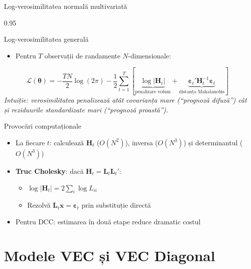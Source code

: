 \documentclass[9pt, aspectratio=169, t]{beamer}
\begin{document}
\begin{frame}{Log-verosimilitatea normală multivariată}
    \begin{cminipage}{0.95\textwidth}
    {\footnotesize
    \begin{block}{Log-verosimilitatea generală}
        \begin{itemize}\setlength{\itemsep}{0pt}
            \item Pentru $T$ observații de randamente $N$-dimensionale:
        \end{itemize}
        \[
            \mathcal{L}(\boldsymbol{\theta}) = -\frac{TN}{2}\log(2\pi) - \frac{1}{2}\sum_{t=1}^T \left[ \underbrace{\log|\mathbf{H}_t|}_{\text{penalizare volum}} + \underbrace{\boldsymbol{\varepsilon}_t'\mathbf{H}_t^{-1}\boldsymbol{\varepsilon}_t}_{\text{distanța Mahalanobis}} \right]
        \]
        \textit{Intuiție: verosimilitatea penalizează atât covarianța mare (``prognoză difuză'') cât și reziduurile standardizate mari (``prognoză proastă'').}
    \end{block}
    \begin{block}{Provocări computaționale}
        \begin{itemize}\setlength{\itemsep}{0pt}
            \item La fiecare $t$: calculează $\mathbf{H}_t$ ($O(N^2)$), inversa ($O(N^3)$) și determinantul ($O(N^3)$)
            \item \textbf{Truc Cholesky}: dacă $\mathbf{H}_t = \mathbf{L}_t\mathbf{L}_t'$:
                \begin{itemize}\setlength{\itemsep}{0pt}
                    \item $\log|\mathbf{H}_t| = 2\sum_{i}\log L_{ii}$
                    \item Rezolvă $\mathbf{L}_t\mathbf{x} = \boldsymbol{\varepsilon}_t$ prin substituție directă
                \end{itemize}
            \item Pentru DCC: estimarea în două etape reduce dramatic costul
        \end{itemize}
    \end{block}
    }
    \end{cminipage}
\end{frame}

\section{Modele VEC și VEC Diagonal}
\end{document}
